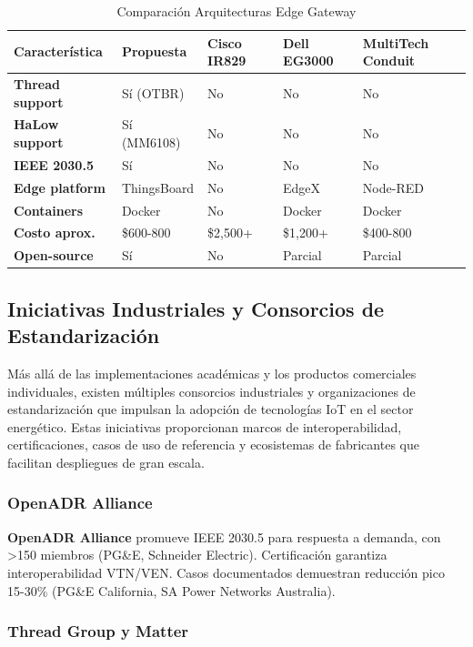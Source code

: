 \begin{table}[h]
\centering
\caption{Comparación Arquitecturas Edge Gateway}
\label{tab:edge-gateway-comparison}
\begin{tabular}{|p{3.5cm}|p{2.5cm}|p{2.5cm}|p{2.5cm}|p{2.5cm}|}
\hline
\textbf{Característica} & \textbf{Propuesta} & \textbf{Cisco IR829} & \textbf{Dell EG3000} & \textbf{MultiTech Conduit} \\
\hline
\textbf{Thread support} & Sí (OTBR) & No & No & No \\
\hline
\textbf{HaLow support} & Sí (MM6108) & No & No & No \\
\hline
\textbf{IEEE 2030.5} & Sí & No & No & No \\
\hline
\textbf{Edge platform} & ThingsBoard & No & EdgeX & Node-RED \\
\hline
\textbf{Containers} & Docker & No & Docker & Docker \\
\hline
\textbf{Costo aprox.} & \$600-800 & \$2,500+ & \$1,200+ & \$400-800 \\
\hline
\textbf{Open-source} & Sí & No & Parcial & Parcial \\
\hline
\end{tabular}
\end{table}

\subsection{Iniciativas Industriales y Consorcios de Estandarización}

Más allá de las implementaciones académicas y los productos comerciales individuales, existen múltiples consorcios industriales y organizaciones de estandarización que impulsan la adopción de tecnologías IoT en el sector energético. Estas iniciativas proporcionan marcos de interoperabilidad, certificaciones, casos de uso de referencia y ecosistemas de fabricantes que facilitan despliegues de gran escala.

\subsubsection{OpenADR Alliance}

\textbf{OpenADR Alliance} promueve IEEE 2030.5 para respuesta a demanda, con >150 miembros (PG\&E, Schneider Electric). Certificación garantiza interoperabilidad VTN/VEN. Casos documentados demuestran reducción pico 15-30\% (PG\&E California, SA Power Networks Australia).

\subsubsection{Thread Group y Matter}

